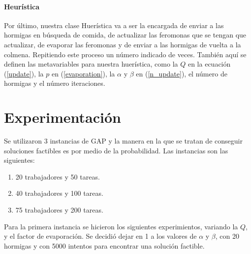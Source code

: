 \documentclass{article}
\begin{document}
    \paragraph{ Heurística }
    Por último, nuestra clase Huerística va a ser la encargada 
    de enviar a las hormigas en búsqueda de comida, de actualizar
    las feromonas que se tengan que actualizar, de evaporar las
    feromonas y de enviar a las hormigas de vuelta a la colmena.
    Repitiendo este proceso un número indicado de veces.
    También aquí se definen las metavariables para nuestra 
    huerística, como la $Q$ en la ecuación (\ref{update}),
    la $p$ en (\ref{evaporation}), la $\alpha$ y $\beta$ en 
    (\ref{n_update}), el número de hormigas y el número iteraciones.

    \section{Experimentación} \label{experimentation}
    Se utilizaron 3 instancias de GAP y la manera en la que 
    se tratan de conseguir soluciones factibles es por medio
    de la probabilidad. Las instancias son las siguientes:
    
    \begin{enumerate}
      \item 20 trabajadores y 50 tareas.
      \item 40 trabajadores y 100 tareas.
      \item 75 trabajadores y 200 tareas.
    \end{enumerate}

    Para la primera instancia se hicieron los siguientes 
    experimientos, variando la $Q$, y el factor de evaporación. 
    Se decidió dejar en 1 a los valores de $\alpha$ y $\beta$, 
    con 20 hormigas y con 5000 intentos para encontrar una 
    solución factible.
\end{document}
